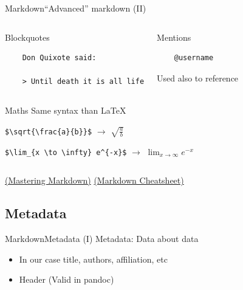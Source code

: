 \documentclass{beamer}
\begin{document}
\begin{frame}[fragile]{Markdown}{``Advanced'' markdown (II)}
	\begin{columns}
	\begin{block}{Blockquotes}
	\begin{verbatim}
	Don Quixote said:

	> Until death it is all life
	\end{verbatim}
	\end{block}

	\begin{block}{Mentions}
	\begin{verbatim}
	@username
	\end{verbatim}
	Used also to reference
	\end{block}
	\end{columns}

	\begin{columns}
	\begin{block}{Maths}
	Same syntax than \LaTeX

	\verb|$\sqrt{\frac{a}{b}}$| $\rightarrow$ $\sqrt{\frac{a}{b}}$

	\verb|$\lim_{x \to \infty} e^{-x}$| $\rightarrow$ $\lim_{x \to \infty} e^{-x}$
	\end{block}

	\end{columns}

	\bigskip
	\href{https://guides.github.com/features/mastering-markdown/}{(Mastering Markdown)}
	\href{https://github.com/adam-p/markdown-here/wiki/Markdown-Cheatsheet}{(Markdown Cheatsheet)}
\end{frame}


\subsection{Metadata}



\begin{frame}{Markdown}{Metadata (I)}
	Metadata: Data about data
	\begin{itemize}
		\item In our case title, authors, affiliation, etc
		\item Header (Valid in pandoc)
	\end{itemize}
\footnotesize{
	\begin{exampleblock}{}
	\vspace{-0.2cm}
	
	\vspace{-0.2cm}
	\end{exampleblock}
	}
\end{frame}
\end{document}
